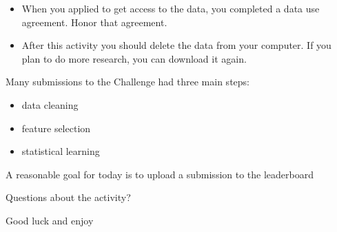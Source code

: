 \documentclass[aspectratio=169]{beamer}
\begin{document}
\begin{frame}

\begin{itemize}
\item When you applied to get access to the data, you completed a data use agreement. Honor that agreement. \pause
\item After this activity you should delete the data from your computer. If you plan to do more research, you can download it again.
\end{itemize}

\end{frame}
\begin{frame}

Many submissions to the Challenge had three main steps:
\begin{itemize}
\item data cleaning \pause
\item feature selection \pause
\item statistical learning \pause
\end{itemize}

\end{frame}
\begin{frame}

A reasonable goal for today is to upload a submission to the leaderboard

\end{frame}
\begin{frame}

Questions about the activity?

\end{frame}
\begin{frame}

\begin{center}
\LARGE Good luck and enjoy
\end{center}

\end{frame}
\end{document}
